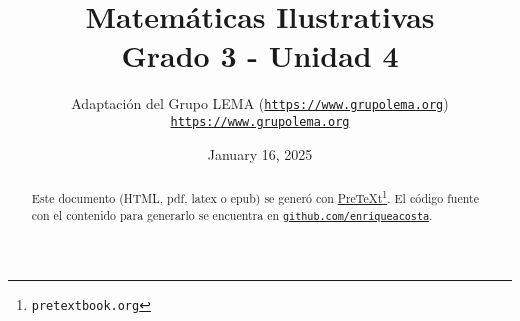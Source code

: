 
\title{Matemáticas Ilustrativas\\
{\large Grado 3 - Unidad 4}}
\author{Adaptación del Grupo LEMA (\href{https://www.grupolema.org}{\nolinkurl{https://www.grupolema.org}})\\
\href{https://www.grupolema.org}{\nolinkurl{https://www.grupolema.org}}
}
\date{January 16, 2025}

\usepackage{comment}


\raggedbottom
\label{gra3-uni4}\hypertarget{gra3-uni4}{}
\maketitle
\thispagestyle{empty}
\renewcommand*{\abstractname}{}
\begin{abstract}
Este documento (HTML, pdf, latex o epub) se generó con \href{https://pretextbook.org}{PreTeXt}\footnote{\nolinkurl{pretextbook.org}\label{meta-source-2-2}}. El código fuente con el contenido para generarlo se encuentra en \href{https://github.com/enriqueacosta/IllustrativeMath-GrupoLEMA}{\nolinkurl{github.com/enriqueacosta}}.%
\end{abstract}
\cleardoublepage
\renewcommand*{\abstractname}{Licencia}
